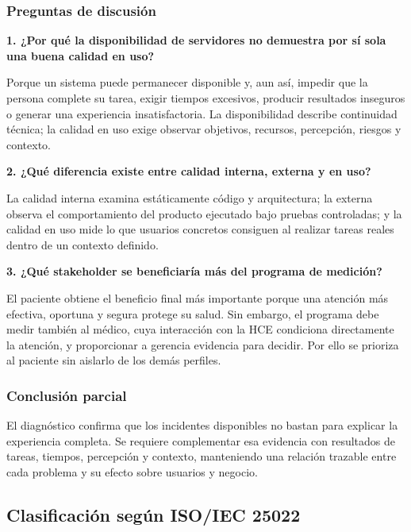 \subsubsection{Preguntas de discusión}

\textbf{1. ¿Por qué la disponibilidad de servidores no demuestra por sí sola una buena calidad en uso?}

Porque un sistema puede permanecer disponible y, aun así, impedir que la persona complete su tarea, exigir tiempos excesivos, producir resultados inseguros o generar una experiencia insatisfactoria. La disponibilidad describe continuidad técnica; la calidad en uso exige observar objetivos, recursos, percepción, riesgos y contexto.

\textbf{2. ¿Qué diferencia existe entre calidad interna, externa y en uso?}

La calidad interna examina estáticamente código y arquitectura; la externa observa el comportamiento del producto ejecutado bajo pruebas controladas; y la calidad en uso mide lo que usuarios concretos consiguen al realizar tareas reales dentro de un contexto definido.

\textbf{3. ¿Qué stakeholder se beneficiaría más del programa de medición?}

El paciente obtiene el beneficio final más importante porque una atención más efectiva, oportuna y segura protege su salud. Sin embargo, el programa debe medir también al médico, cuya interacción con la HCE condiciona directamente la atención, y proporcionar a gerencia evidencia para decidir. Por ello se prioriza al paciente sin aislarlo de los demás perfiles.

\subsubsection{Conclusión parcial}

El diagnóstico confirma que los incidentes disponibles no bastan para explicar la experiencia completa. Se requiere complementar esa evidencia con resultados de tareas, tiempos, percepción y contexto, manteniendo una relación trazable entre cada problema y su efecto sobre usuarios y negocio.

\subsection{Clasificación según ISO/IEC 25022}


